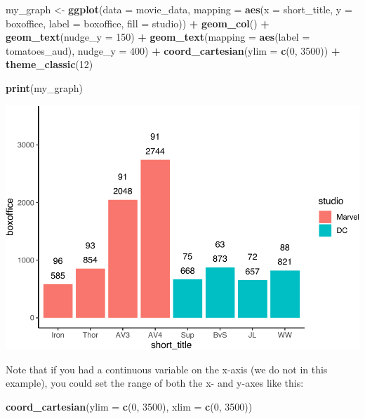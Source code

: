 \documentclass[
]{krantz}
\makeatletter
\newenvironment{Shaded}{\begin{snugshade}}{\end{snugshade}}
\newcommand{\DataTypeTok}[1]{\textcolor[rgb]{0.27,0.27,0.27}{#1}}
\newcommand{\DecValTok}[1]{\textcolor[rgb]{0.06,0.06,0.06}{#1}}
\newcommand{\KeywordTok}[1]{\textcolor[rgb]{0.27,0.27,0.27}{\textbf{#1}}}
\newcommand{\NormalTok}[1]{#1}
\newcommand{\OperatorTok}[1]{\textcolor[rgb]{0.43,0.43,0.43}{\textbf{#1}}}
\newcommand{\StringTok}[1]{\textcolor[rgb]{0.5,0.5,0.5}{#1}}
\newenvironment{kframe}{%
\medskip{}
\setlength{\fboxsep}{.8em}
 \def\at@end@of@kframe{}%
 \ifinner\ifhmode%
  \def\at@end@of@kframe{\end{minipage}}%
  \begin{minipage}{\columnwidth}%
 \fi\fi%
 \def\FrameCommand##1{\hskip\@totalleftmargin \hskip-\fboxsep
 \colorbox{shadecolor}{##1}\hskip-\fboxsep
     \hskip-\linewidth \hskip-\@totalleftmargin \hskip\columnwidth}%
 \MakeFramed {\advance\hsize-\width
   \@totalleftmargin\z@ \linewidth\hsize
   \@setminipage}}%
 {\par\unskip\endMakeFramed%
 \at@end@of@kframe}
\renewenvironment{Shaded}{\begin{kframe}}{\end{kframe}}
\makeatother
\begin{document}
\begin{Shaded}
\begin{Highlighting}[]
\NormalTok{my_graph <-}\StringTok{ }\KeywordTok{ggplot}\NormalTok{(}\DataTypeTok{data =}\NormalTok{ movie_data,}
           \DataTypeTok{mapping =} \KeywordTok{aes}\NormalTok{(}\DataTypeTok{x =}\NormalTok{ short_title,}
                         \DataTypeTok{y =}\NormalTok{ boxoffice,}
                         \DataTypeTok{label =}\NormalTok{ boxoffice, }
                         \DataTypeTok{fill =}\NormalTok{ studio)) }\OperatorTok{+}
\StringTok{  }\KeywordTok{geom_col}\NormalTok{() }\OperatorTok{+}
\StringTok{  }\KeywordTok{geom_text}\NormalTok{(}\DataTypeTok{nudge_y =} \DecValTok{150}\NormalTok{)  }\OperatorTok{+}
\StringTok{  }\KeywordTok{geom_text}\NormalTok{(}\DataTypeTok{mapping =} \KeywordTok{aes}\NormalTok{(}\DataTypeTok{label =}\NormalTok{ tomatoes_aud), }
            \DataTypeTok{nudge_y =} \DecValTok{400}\NormalTok{) }\OperatorTok{+}
\StringTok{  }\KeywordTok{coord_cartesian}\NormalTok{(}\DataTypeTok{ylim =} \KeywordTok{c}\NormalTok{(}\DecValTok{0}\NormalTok{, }\DecValTok{3500}\NormalTok{)) }\OperatorTok{+}
\StringTok{  }\KeywordTok{theme_classic}\NormalTok{(}\DecValTok{12}\NormalTok{)}


\KeywordTok{print}\NormalTok{(my_graph)}
\end{Highlighting}
\end{Shaded}

\includegraphics[width=0.65\linewidth]{bookdown_files/figure-latex/unnamed-chunk-269-1}

Note that if you had a continuous variable on the x-axis (we do not in this example), you could set the range of both the x- and y-axes like this:

\begin{Shaded}
\begin{Highlighting}[]
\KeywordTok{coord_cartesian}\NormalTok{(}\DataTypeTok{ylim =} \KeywordTok{c}\NormalTok{(}\DecValTok{0}\NormalTok{, }\DecValTok{3500}\NormalTok{),}
                \DataTypeTok{xlim =} \KeywordTok{c}\NormalTok{(}\DecValTok{0}\NormalTok{, }\DecValTok{3500}\NormalTok{))}
\end{Highlighting}
\end{Shaded}
\end{document}

